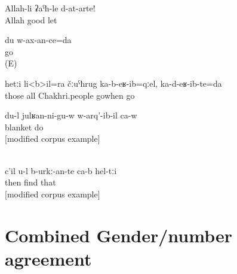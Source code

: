 \begin{exe}

	\ex	\label{ex:‎‎‎May Allah leave you (plural) wellAGREE}
	\gll	Allah-li	ʡaˁħ-le	d-at-arte!\\
		Allah	good	let\\
	\glt	{}
	
	
	\ex	\label{ex:I will go / have to go analytic2}
	\gll	du	w-ax-an-ce=da\\
			go\\
	\glt	{} (E)
	
	\ex	\label{ex:‎When all Chakhri people moved to the lowlands, we (also) moved2}
	\gll	hetːi	li<b>il=ra	čːuˁħrug	ka-b-eʁ-ib=qːel,	ka-d-eʁ-ib-te=da	\\
		those	all	Chakhri.people	gowhen	go\\
	\glt	{}
	
			\ex	\label{ex:‎I gave birth to (my son) under a blanket@B}
		\gll	du-l	julʁan-ni-gu-w	w-arq'-ib-il	ca-w\\
			 blanket	do 	\\
		\glt	{} [modified corpus example]
		
	\\	\label{ex:Then you have to find them2}
	\gll	c'il	u-l	b-urkː-an-te	ca-b	hel-tːi\\
		then		find 		that\\
	\glt	{} [modified corpus example]
\end{exe}


\section{Combined Gender/number agreement}
\label{sec:Gender/number agreement}
